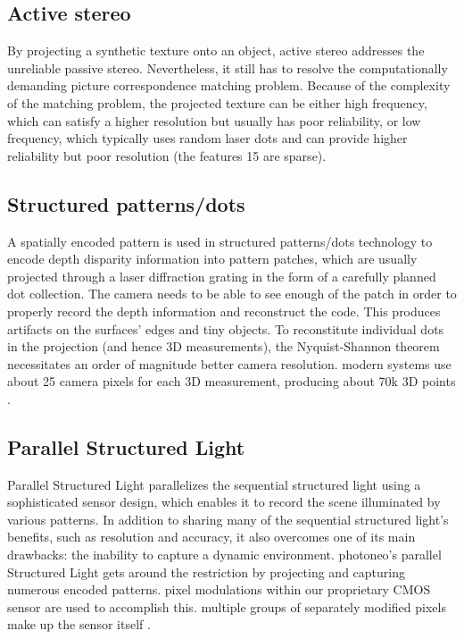 \documentclass[12pt]{article}
\begin{document}
\subsection{Active stereo}
By projecting a synthetic texture onto an object, active stereo addresses the unreliable passive stereo. Nevertheless, it still has to resolve the computationally demanding picture correspondence matching problem. Because of the complexity of the matching problem, the projected texture can be either high frequency, which can satisfy a higher resolution but usually has poor reliability, or low frequency, which typically uses random laser dots and can provide higher reliability but poor resolution (the features 15 are sparse)\cite{ref15}.

\subsection{Structured patterns/dots}
A spatially encoded pattern is used in structured patterns/dots technology to encode depth disparity information into pattern patches, which are usually projected through a laser diffraction grating in the form of a carefully planned dot collection. The camera needs to be able to see enough of the patch in order to properly record the depth information and reconstruct the code. This produces artifacts on the surfaces' edges and tiny objects. To reconstitute individual dots in the projection (and hence 3D measurements), the Nyquist-Shannon theorem necessitates an order of magnitude better camera resolution. modern systems use about 25 camera pixels for each 3D measurement, producing about 70k 3D points \cite{ref15}. 

\subsection{Parallel Structured Light}

Parallel Structured Light parallelizes the sequential structured light using a sophisticated sensor design, which enables it to record the scene illuminated by various patterns. In addition to sharing many of the sequential structured light's benefits, such as resolution and accuracy, it also overcomes one of its main drawbacks: the inability to capture a dynamic environment. photoneo's parallel Structured Light gets around the restriction by projecting and capturing numerous encoded patterns. pixel modulations within our proprietary CMOS sensor are used to accomplish this. multiple groups of separately modified pixels make up the sensor itself \cite{ref15}.  \\
\end{document}
